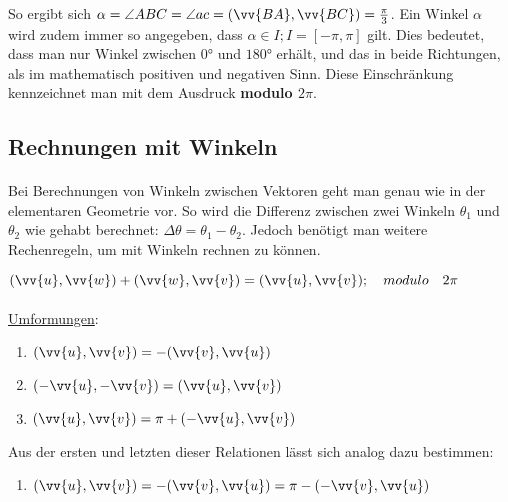         So ergibt sich $\alpha = \angle ABC = \angle ac = (\vv{BA},\vv{BC}) = \frac{\pi}{3}$. Ein Winkel $\alpha$ wird zudem immer so angegeben, dass $\alpha\in I; I = [-\pi,\pi]$ gilt.
        Dies bedeutet, dass man nur Winkel zwischen $0°$ und $180°$ erhält, und das in beide \glqq Richtungen\grqq, als im mathematisch positiven und negativen Sinn.
        Diese Einschränkung kennzeichnet man mit dem Ausdruck \glqq \textbf{modulo $2\pi$}\grqq.


    \subsection{Rechnungen mit Winkeln}

        \paragraph{} Bei Berechnungen von Winkeln zwischen Vektoren geht man genau wie in der elementaren Geometrie vor.
         So wird die Differenz zwischen zwei Winkeln $\theta_{1}$ und $\theta_{2}$ wie gehabt berechnet: $\Delta\theta = \theta_{1} - \theta_{2}$.
         Jedoch benötigt man weitere Rechenregeln, um mit Winkeln rechnen zu können.
        \\
        \begin{Theorem}
            $(\vv{u},\vv{w})+(\vv{w},\vv{v})=(\vv{u},\vv{v});\quad modulo\quad 2\pi$ \\\\
            \underline{Umformungen}: \\
            \begin{enumerate}[(1)]
                \item $(\vv{u},\vv{v})=-(\vv{v},\vv{u})\quad$
                \item $(-\vv{u},-\vv{v})=(\vv{u},\vv{v})\quad$
                \item $(\vv{u},\vv{v})=\pi+(-\vv{u},\vv{v})\quad$
            \end{enumerate}
                Aus der ersten und letzten dieser Relationen lässt sich analog dazu bestimmen:
            \begin{enumerate}[(4)]
                \item $(\vv{u},\vv{v})=-(\vv{v},\vv{u})=\pi-(-\vv{v},\vv{u})\quad$
            \end{enumerate}
        \end{Theorem}

        \vspace{1cm}

